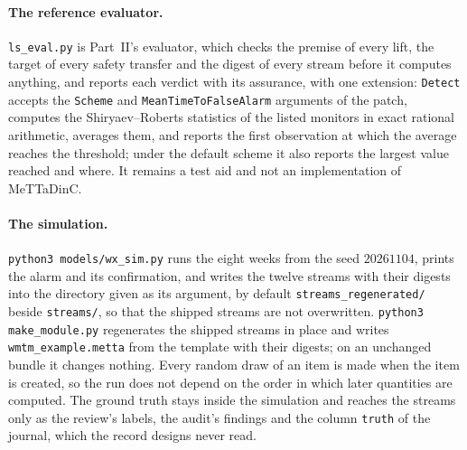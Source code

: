 \documentclass[11pt]{article}
\newcommand{\fpath}[1]{\nolinkurl{#1}}
\newcommand{\code}[1]{\texttt{#1}}
\theoremstyle{definition}
\theoremstyle{plain}
\begin{document}
\paragraph{The reference evaluator.} \fpath{ls_eval.py} is Part~II's evaluator, which checks the
premise of every lift, the target of every safety transfer and the digest of every stream before it
computes anything, and reports each verdict with its assurance, with one extension:
\code{Detect} accepts the \code{Scheme} and \code{MeanTimeToFalseAlarm} arguments of the patch,
computes the Shiryaev--Roberts statistics of the listed monitors in exact rational arithmetic,
averages them, and reports the first observation at which the average reaches the threshold; under
the default scheme it also reports the largest value reached and where. It remains a test aid and
not an implementation of MeTTaDinC.

\paragraph{The simulation.} \code{python3 models/wx\_sim.py} runs the eight weeks from the seed
$20261104$, prints the alarm and its confirmation, and writes the twelve streams with their digests
into the directory given as its argument, by default \fpath{streams_regenerated/} beside
\fpath{streams/}, so that the shipped streams are not overwritten. \code{python3 make\_module.py}
regenerates the shipped streams in place and writes \fpath{wmtm_example.metta} from the template
with their digests; on an unchanged bundle it changes nothing. Every random draw of an item is made
when the item is created, so the run does not depend on the order in which later quantities are
computed. The ground truth stays inside the simulation and reaches the streams only
as the review's labels, the audit's findings and the column \code{truth} of the journal, which the
record designs never read.
\end{document}
